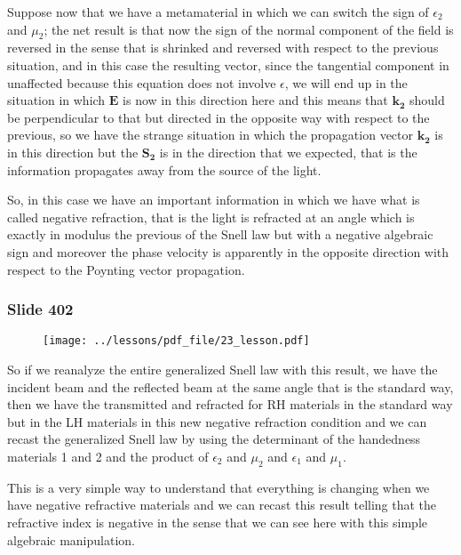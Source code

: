 \documentclass[../main/main.tex]{subfiles}
\begin{document}
Suppose now that we have a metamaterial in which we can switch the sign of $\epsilon_2$ and $\mu_2$; the net result is that now the sign of the normal component of the field is reversed in the sense that is shrinked and reversed with respect to the previous situation, and in this case the resulting vector, since the tangential component in unaffected because this equation does not involve $\epsilon$, we will end up in the situation in which $\mathbf{E}$ is now in this direction here and this means that $\mathbf{k_2}$ should be perpendicular to that but directed in the opposite way with respect to the previous, so we have the strange situation in which the propagation vector $\mathbf{k_2}$ is in this direction but the $\mathbf{S_2}$ is in the direction that we expected, that is the information propagates away from the source of the light.

So, in this case we have an important information in which we have what is called negative refraction, that is the light is refracted at an angle which is exactly in modulus the previous of the Snell law but with a negative algebraic sign and moreover the phase velocity is apparently in the opposite direction with respect to the Poynting vector propagation.

\newpage

\subsubsection{Slide 402}

\begin{figure}[h!]
\centering
\texttt{[image: ../lessons/pdf\_file/23\_lesson.pdf]}
\end{figure}

So if we reanalyze the entire generalized Snell law with this result, we have the incident beam and the reflected beam at the same angle that is the standard way, then we have the transmitted and refracted for RH materials in the standard way but in the LH materials in this new negative refraction condition and we can recast the generalized Snell law by using the determinant of the handedness materials 1 and 2 and the product of $\epsilon_2$ and $\mu_2$ and $\epsilon_1$ and $\mu_1$.

This is a very simple way to understand that everything is changing when we have negative refractive materials and we can recast this result telling that the refractive index is negative in the sense that we can see here with this simple algebraic manipulation.
\end{document}
